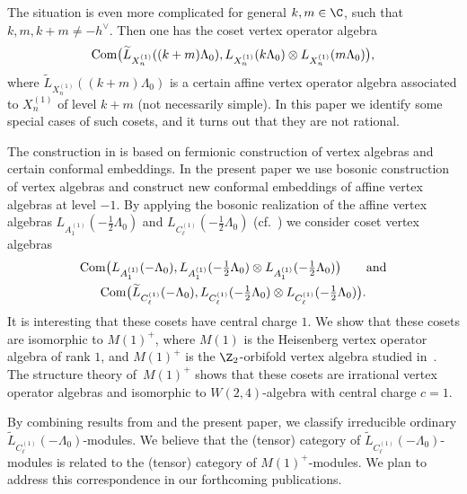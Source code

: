 \documentclass[pdftex]{sigma}
\begin{document}
The situation is even more complicated for general $k,m \in \C$,
such that $k,m,k+m \neq - h^{\vee}$. Then one has the coset vertex
operator algebra
\[ {\rm Com}\big({\widetilde L}_{X_{n}^{(1)}}((k+m) \Lambda _0) ,
L_{X_{n}^{(1)}}(k \Lambda _0) \otimes L_{X_{n}^{(1)}}(m \Lambda
_0)\big), \]
where ${\widetilde L}_{X_{n}^{(1)}}((k+m) \Lambda _0)$ is a certain
af\/f\/ine vertex operator algebra associated to $X_{n}^{(1)}$ of level
$k+m$ (not necessarily simple). In this paper we identify some
special cases of such cosets, and it turns out that they are not
rational.



   The construction in \cite{AP-2010} is based on fermionic construction of vertex  algebras and certain conformal embeddings.
   In the present paper we use bosonic construction of vertex  algebras  and construct new conformal embeddings
   of af\/f\/ine vertex algebras at level $-1$. By applying the bosonic realization  of
the af\/f\/ine vertex  algebras $L_{A_1 ^{(1)}}(-\tfrac{1}{2}\Lambda_0)$
and $L_{C_{\ell} ^{(1)}}(-\tfrac{1}{2}\Lambda_0)$ (cf.~\cite{FF}) we
consider coset vertex   algebras
\begin{gather}   \mbox{Com}\big( L_{A_1 ^{(1)}}(- \Lambda_0),L_{A_1
^{(1)}}(-\tfrac{1}{2}\Lambda_0) \otimes L_{A_1
^{(1)}}(-\tfrac{1}{2}\Lambda_0)\big) \qquad \mbox{and} \nonumber\\
  {\rm Com} \big( {\widetilde L}_{C_{\ell} ^{(1)}}(-\Lambda_0),
L_{C_{\ell} ^{(1)}}(-\tfrac{1}{2}\Lambda_0) \otimes L_{C_{\ell}
^{(1)}}(-\tfrac{1}{2}\Lambda_0) \big). \label{coset-uvod}
\end{gather}
It is interesting that these cosets   have central charge $1$. We
show that these cosets are isomorphic to  $M(1) ^+$, where $M(1)$ is
the Heisenberg vertex operator algebra of rank $1$, and $M(1)^+$ is
the $\Z _2$-orbifold vertex algebra studied in~\cite{DN1}. The
structure theory of~$M(1) ^+$ shows that these cosets are irrational
vertex operator algebras and isomorphic to $W(2,4)$-algebra with
central charge $c=1$.

{\sloppy By combining results from \cite{A1} and the present paper, we
classify irreducible ordinary  $\widetilde{L}_{C_{\ell}
^{(1)}}(-\Lambda_0)$-modules. We believe that the (tensor) category
of  $\widetilde{L}_{C_{\ell} ^{(1)}}(-\Lambda_0)$-modules is
related  to the (tensor) category of $M(1) ^+$-modules. We plan to
address this correspondence in our forthcoming publications.

}
\end{document}
